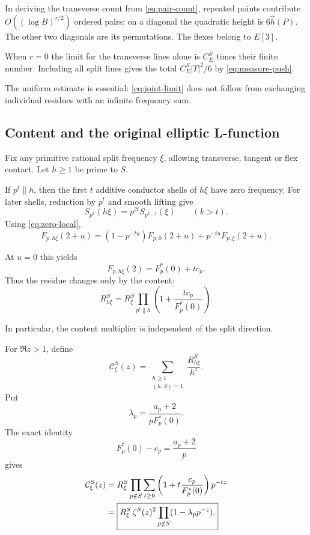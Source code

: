 \documentclass[11pt]{article}
\begin{document}
In deriving the transverse count from \eqref{eq:pair-count},
repeated points contribute $O((\log B)^{r/2})$ ordered pairs:
on a diagonal the quadratic height is $6\hat h(P)$. The other two
diagonals are its permutations. The flexes belong to $E[3]$.

When $r=0$ the limit for the transverse lines alone is $C_E^S$
times their finite number. Including all split lines gives the total
$C_E^S|T|^2/6$ by \eqref{eq:measure-push}.

The uniform estimate is essential:
\eqref{eq:joint-limit} does not follow
from exchanging individual residues
with an infinite frequency sum.

\subsection{Content and the original elliptic L-function}

Fix any primitive rational split frequency
$\xi$, allowing transverse, tangent or flex
contact. Let $h\ge1$ be prime to $S$.

If $p^t\parallel h$, then the first $t$
additive conductor shells of $h\xi$
have zero frequency.
For later shells, reduction by $p^t$
and smooth lifting give
\[
S_{p^k}(h\xi)=p^{2t}S_{p^{k-t}}(\xi)
\qquad(k>t).
\]
Using \eqref{eq:zero-local},
\[
\boxed{
F_{p,h\xi}(2+u)
=
(1-p^{-tu})F_{p,0}(2+u)
+p^{-tu}F_{p,\xi}(2+u).
}
\]

At $u=0$ this yields
\[
F_{p,h\xi}(2)
=
F_p^*(0)+t c_p.
\]
Thus the residue changes only by the
content:
\begin{equation}\label{eq:content-residue}
\boxed{
R_{h\xi}^S
=
R_\xi^S
\prod_{p^t\parallel h}
\left(1+\frac{t c_p}{F_p^*(0)}\right).
}
\end{equation}

In particular, the content multiplier is
independent of the split direction.

For $\Re z>1$, define
\[
\mathcal C_\xi^S(z)=
\sum_{\substack{h\ge1\\(h,S)=1}}
\frac{R_{h\xi}^S}{h^z}.
\]
Put
\[
\lambda_p=
\frac{a_p+2}{pF_p^*(0)}.
\]
The exact identity
\[
F_p^*(0)-c_p=\frac{a_p+2}{p}
\]
gives
\begin{align}
\mathcal C_\xi^S(z)
&=
R_\xi^S
\prod_{p\notin S}
\sum_{t\ge0}
\left(1+t\frac{c_p}{F_p^*(0)}\right)
p^{-tz}\notag\\
&=
\boxed{
R_\xi^S\,\zeta^S(z)^2
\prod_{p\notin S}(1-\lambda_pp^{-z}).
}
\label{eq:content-euler}
\end{align}
\end{document}
